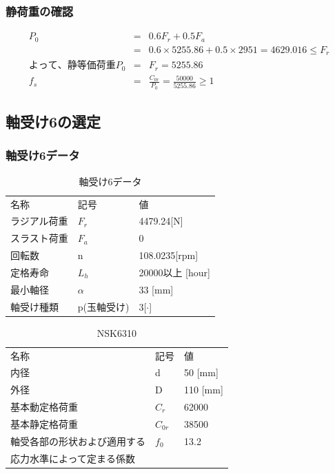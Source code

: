 \documentclass[a4j,twoside,openright,11pt]{jreport}
\begin{document}
\subsubsection{静荷重の確認}
\begin{eqnarray}
P_0&=&0.6F_r+0.5F_a\\
&=&0.6 \times 5255.86 + 0.5 \times 2951 = 4629.016 \leq F_r\\
よって、静等価荷重P_0 &=& F_r = 5255.86\\
f_s &=& \frac{C_{0r}}{P_0} = \frac{50000}{5255.86}\geq 1
\end{eqnarray}


\newpage
\subsection{軸受け6の選定}

\subsubsection{軸受け6データ}
\begin{table}[htb]
\begin{center}
  \caption{軸受け6データ}
  \begin{tabular}{lll} \hline
名称&記号&値\\
ラジアル荷重&$F_r$&4479.24[N]\\
スラスト荷重&$F_a$&0\\
回転数&n&108.0235[rpm]\\
定格寿命&$L_h$&20000以上 [hour]\\
最小軸径&$\alpha$&33 [mm]\\
軸受け種類&p(玉軸受け)&3[$\cdot$]\\
\hline
  \end{tabular}
\end{center}
\end{table}

\begin{table}[htb]
\begin{center}
  \caption{NSK6310}
  \begin{tabular}{lll} \hline
名称&記号&値\\
内径& d &50 [mm]\\
外径& D &110 [mm]\\
基本動定格荷重&$C_{r}$&62000\\
基本静定格荷重&$C_{0r}$&38500\\
軸受各部の形状および適用する&$f_0$&13.2\\
応力水準によって定まる係数&&\\
\hline
  \end{tabular}
\end{center}
\end{table}
\end{document}
